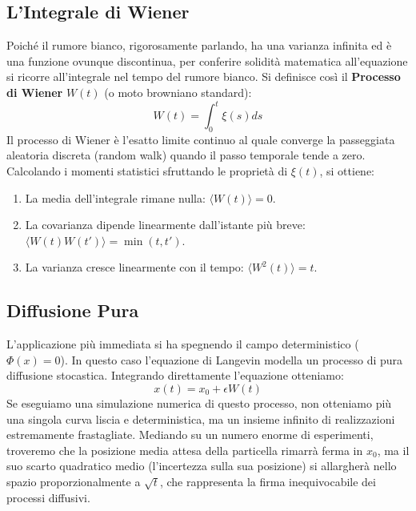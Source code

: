 \documentclass[12pt,a4paper]{article}
\begin{document}
\subsection{L'Integrale di Wiener}
Poiché il rumore bianco, rigorosamente parlando, ha una varianza infinita ed è una funzione ovunque discontinua, per conferire solidità matematica all'equazione si ricorre all'integrale nel tempo del rumore bianco. Si definisce così il \textbf{Processo di Wiener} $W(t)$ (o moto browniano standard):
\begin{equation}
W(t) = \int_0^t \xi(s) ds
\end{equation}
Il processo di Wiener è l'esatto limite continuo al quale converge la passeggiata aleatoria discreta (random walk) quando il passo temporale tende a zero. Calcolando i momenti statistici sfruttando le proprietà di $\xi(t)$, si ottiene:
\begin{enumerate}
    \item La media dell'integrale rimane nulla: $\langle W(t) \rangle = 0$.
    \item La covarianza dipende linearmente dall'istante più breve: $\langle W(t) W(t') \rangle = \min(t, t')$.
    \item La varianza cresce linearmente con il tempo: $\langle W^2(t) \rangle = t$.
\end{enumerate}

\subsection{Diffusione Pura}
L'applicazione più immediata si ha spegnendo il campo deterministico ($\Phi(x) = 0$). In questo caso l'equazione di Langevin modella un processo di pura diffusione stocastica. Integrando direttamente l'equazione otteniamo:
\begin{equation}
x(t) = x_0 + \epsilon W(t)
\end{equation}
Se eseguiamo una simulazione numerica di questo processo, non otteniamo più una singola curva liscia e deterministica, ma un insieme infinito di realizzazioni estremamente frastagliate. Mediando su un numero enorme di esperimenti, troveremo che la posizione media attesa della particella rimarrà ferma in $x_0$, ma il suo scarto quadratico medio (l'incertezza sulla sua posizione) si allargherà nello spazio proporzionalmente a $\sqrt{t}$, che rappresenta la firma inequivocabile dei processi diffusivi.

\newpage
\end{document}
